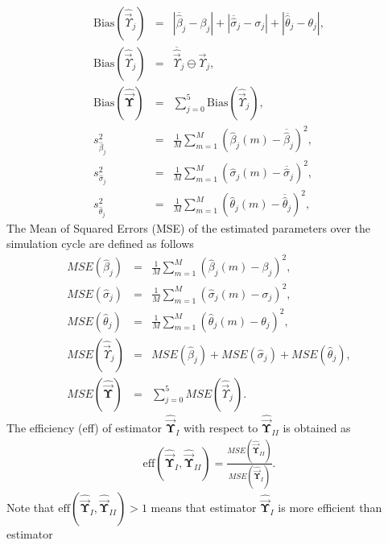 \documentclass{IJFS}
\begin{document}
\begin{eqnarray*}
\textrm{Bias}(\widehat{\vec{\Upsilon}}_j)            &=& \left|\overline{\widehat{\beta}}_j-\beta_j\right|+\left|\overline{\widehat{\sigma}}_j-\sigma_j\right|+\left|\overline{\widehat{\theta}}_j-\theta_j\right|,\\
\textrm{Bias}(\widehat{\vec{\Upsilon}}_j)            &=& \overline{\widehat{\vec{\Upsilon}}}_j \ominus \vec{\Upsilon}_j,\\
\textrm{Bias}(\widehat{\vec{\boldsymbol{\Upsilon}}}) &=& \sum_{j=0}^{5} \textrm{Bias}(\widehat{\vec{\Upsilon}}_j),\\
s^2_{\widehat{\beta}_j}&=&\frac{1}{M}  \sum_{m=1}^M (\widehat{\beta}_j(m)-\overline{\widehat{\beta}}_j)^2,\\
s^2_{\widehat{\sigma}_j}&=&\frac{1}{M} \sum_{m=1}^M (\widehat{\sigma}_j(m)-\overline{\widehat{\sigma}}_j)^2,\\
s^2_{\widehat{\theta}_j}&=&\frac{1}{M} \sum_{m=1}^M (\widehat{\theta}_j(m)-\overline{\widehat{\theta}}_j)^2,
\end{eqnarray*}
The Mean of Squared Errors (MSE) of the estimated parameters over the simulation cycle are defined as follows
\begin{eqnarray*}
MSE(\widehat{\beta}_j)  &=&\frac{1}{M} \sum_{m=1}^M ( \widehat{\beta}_j(m)- \beta_j)^2,\\
MSE(\widehat{\sigma}_j) &=&\frac{1}{M} \sum_{m=1}^M (\widehat{\sigma}_j(m)-\sigma_j)^2,\\
MSE(\widehat{\theta}_j) &=&\frac{1}{M} \sum_{m=1}^M (\widehat{\theta}_j(m)-\theta_j)^2,\\
MSE(\widehat{\vec{\Upsilon}}_j) &=& MSE(\widehat{\beta}_j)+MSE(\widehat{\sigma}_j)+MSE(\widehat{\theta}_j),\\
MSE(\widehat{\vec{\boldsymbol{\Upsilon}}}) &=& \sum_{j=0}^{5}MSE(\widehat{\vec{\Upsilon}}_j).
\end{eqnarray*}
The  efficiency (eff) of  estimator
$\widehat{\vec{\boldsymbol{\Upsilon}}}_I$ with respect to
$\widehat{\vec{\boldsymbol{\Upsilon}}}_{II}$ is obtained as
\begin{eqnarray*}
\textrm{eff}(\widehat{\vec{\boldsymbol{\Upsilon}}}_I,\widehat{\vec{\boldsymbol{\Upsilon}}}_{II}) =
\frac{MSE(\widehat{\vec{\boldsymbol{\Upsilon}}}_{II})}{MSE(\widehat{\vec{\boldsymbol{\Upsilon}}}_{I})}.
\end{eqnarray*}
Note that $\textrm{eff}(\widehat{\vec{\boldsymbol{\Upsilon}}}_I,\widehat{\vec{\boldsymbol{\Upsilon}}}_{II})>1$ means that estimator
$\widehat{\vec{\boldsymbol{\Upsilon}}}_{I}$ is more efficient than estimator
\end{document}
